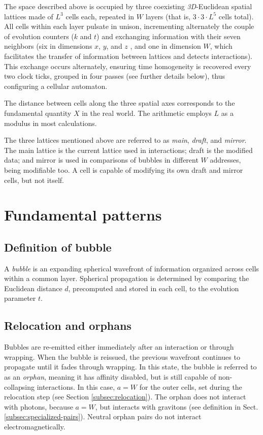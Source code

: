 \documentclass[12pt,english]{article}
\begin{document}
The space described above is occupied by three coexisting \emph{3D}-Euclidean spatial lattices made of $L^{3}$ cells each, repeated in $W$ layers (that is, $3\cdot3\cdot L^{5}$ cells total). All cells within each layer pulsate in unison, incrementing alternately the couple of evolution counters ($k$ and $t$) and exchanging information with their seven neighbors (six in dimensions $x$, $y$, and \ensuremath{z} , and one in dimension $W$, which facilitates the transfer of information between lattices and detects interactions). This exchange occurs alternately, ensuring time homogeneity is recovered every two clock ticks, grouped in four passes (see further details below), thus configuring a cellular automaton. 

The distance between cells along the three spatial axes corresponds to the fundamental quantity $X$ in the real world. The arithmetic employs $L$ as a modulus in most calculations.

The three lattices mentioned above are referred to as \textit{main}, \textit{draft}, and \textit{mirror}. The main lattice is the current lattice used in interactions; draft is the modified data; and mirror is used in comparisons of bubbles in different $W$ addresses, being modifiable too. A cell is capable of modifying its own draft and mirror cells, but not itself.


\section{Fundamental patterns\label{sec:Bubbles}}

\subsection{Definition of bubble}

A \emph{bubble} is an expanding spherical wavefront of information organized across cells within a common layer. Spherical propagation is determined by comparing the Euclidean distance $d$, precomputed and stored in each cell, to the evolution parameter $t$. 

\subsection{Relocation and orphans}\label{subsec-reloaction}

Bubbles are re-emitted either immediately after an interaction or through wrapping. When the bubble is reissued, the previous wavefront continues to propagate until it fades through wrapping. In this state, the bubble is referred to as an \textit{orphan}, meaning it has affinity disabled, but is still capable of non-collapsing interactions. In this case, $a=W$ for the outer cells, set during the relocation step (see Section \ref{subsec:relocation}). The orphan does not interact with photons, because $a=W$, but interacts with gravitons (see definition in Sect. \ref{subsec:specialized-pairs}). Neutral orphan pairs do not interact electromagnetically.
\end{document}
